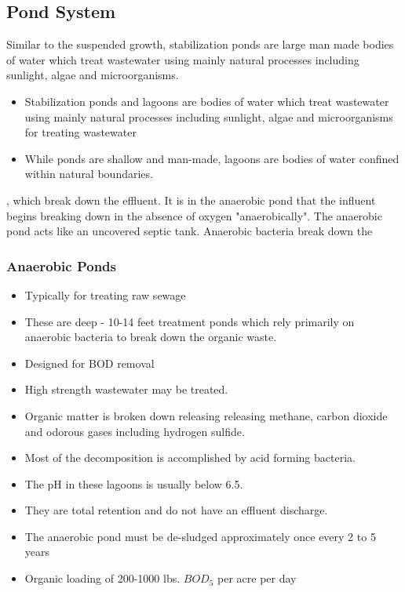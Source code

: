 \documentclass{article}
\begin{document}
\subsection{Pond System}
Similar to the suspended growth, stabilization ponds are large man made bodies of water which treat wastewater using mainly natural processes including sunlight, algae and microorganisms.
\begin{itemize}
\item Stabilization ponds and lagoons are bodies of water which treat wastewater using mainly natural processes including sunlight, algae and microorganisms for treating wastewater\\
\item While ponds are shallow and man-made, lagoons are bodies of water confined within natural boundaries.\\
\end{itemize}

 , which break down the effluent. It is in the anaerobic pond that the influent begins breaking down in the absence of oxygen "anaerobically". The anaerobic pond acts like an uncovered septic tank. Anaerobic bacteria break down the 

\subsubsection{Anaerobic Ponds}	

\begin{itemize}	
\item Typically for treating raw sewage
\item These are deep - 10-14 feet treatment ponds which rely primarily on anaerobic bacteria to break down the organic waste.
\item Designed for BOD removal
\item High strength wastewater may be treated.
\item Organic matter is broken down releasing releasing methane, carbon dioxide and odorous gases including hydrogen sulfide. 
\item Most of the decomposition is accomplished by acid forming bacteria. 
\item The pH in these lagoons is usually below 6.5. 
\item They are total retention and do not have an effluent discharge. 
\item The anaerobic pond must be de-sludged approximately once every 2 to 5 years
\item Organic loading of 200-1000 lbs. $BOD_5$ per acre per day
\end{itemize}
\end{document}

